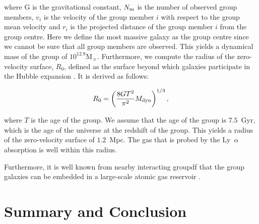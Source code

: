 \documentclass[a4paper,fleqn,usenatbib]{mnras}
\begin{document}
{where G is the gravitational constant, $N_{\rm m}$ is the number of observed group members, $v_i$ is the velocity of the group member $i$ with respect to the group mean velocity and $r_i$ is the projected distance of the group member $i$ from the group centre. Here we define the most massive galaxy as the group centre since we cannot be sure that all group members are observed. This yields a dynamical mass of the group of $10^{12.9} \text{M}_{\sun}$. Furthermore, we compute the radius of the zero-velocity surface, $R_0$, defined as the surface beyond which galaxies participate in the Hubble expansion \mbox{\citep{Sandage1986redshift}}. It is derived as follows:

\begin{equation}
R_0 = \left( \frac{8 G T^2}{\pi^2} M_{\rm dyn} \right)^{1/3},
\end{equation}

where $T$ is the age of the group. We assume that the age of the group is $7.5$~Gyr, which is the age of the universe at the redshift of the group. This yields a radius of the zero-velocity surface of $1.2$~Mpc. The gas that is probed by the Ly~$\alpha$ absorption is well within this radius.

Furthermore, it is well known from nearby interacting groupdf that the group galaxies can be embedded in a large-scale atomic gas reservoir \citep{Yun1994highres}.




\section{Summary and Conclusion}

}
\end{document}
